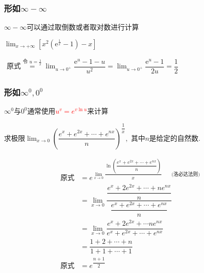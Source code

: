 \documentclass[12pt, a4paper, oneside, UTF8]{ctexbook}
\begin{document}
\begin{sloppypar}
    \subsubsection{形如$\infty -\infty$}
          $\infty -\infty$可以通过取倒数或者取对数进行计算
              \begin{problem}
              $\lim_{x\to+\infty}\left[x^2\left(\mathrm{e}^{\frac{1}{x}}-1\right)-x\right]$
              \end{problem}
              \begin{solution}
                  $
                      \begin{aligned}
                          \text{原式}\overset{\text{令 }u=\frac1x}{\operatorname*{=}}\lim_{u\to0^+}\dfrac{\mathrm{e}^u-1-u}{u^2}=\lim_{u\to0^+}\dfrac{\mathrm{e}^u-1}{2u}=\dfrac12
                      \end{aligned}
                  $
              \end{solution}
    \subsubsection{形如$\infty^0,0^0$}
          $\infty ^0$与$0^0$通常使用\textcolor{red}
              {$ u^v=e^{v \ln u}$}来计算

              \begin{problem}
              求极限$\lim_{x\to0}\left(\dfrac{e^x+e^{2x}+\cdots+e^{nx}}n\right)^{\dfrac{1}{x}},$ 其中$n$是给定的自然数.
              \end{problem}
              \begin{solution}
                  \begin{align*}
                      \text{原式} & = e^{\lim_{x \to 0} \dfrac{\ln \left(\dfrac{e^x+e^{2x}+\cdots+e^{nx}}n\right)}{x}\qquad \text{(洛必达法则)} } \\
                                & =\lim_{x\to0}\dfrac{\dfrac{e^{x}+2e^{2x}+\cdots+ne^{nx}}{n}}{\dfrac{e^{x}+e^{2x}+\cdots+e^{nx}}{n}}       \\
                                & = \lim_{x\to0}\dfrac{e^{x}+2e^{2x}+\cdots ne^{nx}}{e^{x}+e^{2x}+\cdots+e^{nx}}                          \\
                                & =\dfrac{1+2+\cdots+n}{1+1+\cdots+1}                                                                     \\
                      \text{原式} & = e^{\dfrac{n+1}{2}}
                  \end{align*}
              \end{solution}

\end{sloppypar}
\end{document}
